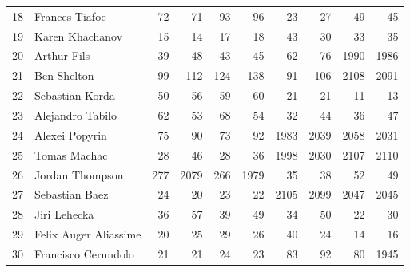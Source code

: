 \begin{table}[ht!]
\begin{tabular}{rlrrrrrrrr}
    18 & Frances Tiafoe & 72 & 71 & 93 & 96 & 23 & 27 & 49 & 45 \\
    19 & Karen Khachanov & 15 & 14 & 17 & 18 & 43 & 30 & 33 & 35 \\
    20 & Arthur Fils & 39 & 48 & 43 & 45 & 62 & 76 & 1990 & 1986 \\
    21 & Ben Shelton & 99 & 112 & 124 & 138 & 91 & 106 & 2108 & 2091 \\
    22 & Sebastian Korda & 50 & 56 & 59 & 60 & 21 & 21 & 11 & 13 \\
    23 & Alejandro Tabilo & 62 & 53 & 68 & 54 & 32 & 44 & 36 & 47 \\
    24 & Alexei Popyrin & 75 & 90 & 73 & 92 & 1983 & 2039 & 2058 & 2031 \\
    25 & Tomas Machac & 28 & 46 & 28 & 36 & 1998 & 2030 & 2107 & 2110 \\
    26 & Jordan Thompson & 277 & 2079 & 266 & 1979 & 35 & 38 & 52 & 49 \\
    27 & Sebastian Baez & 24 & 20 & 23 & 22 & 2105 & 2099 & 2047 & 2045 \\
    28 & Jiri Lehecka & 36 & 57 & 39 & 49 & 34 & 50 & 22 & 30 \\
    29 & Felix Auger Aliassime & 20 & 25 & 29 & 26 & 40 & 24 & 14 & 16 \\
    30 & Francisco Cerundolo & 21 & 21 & 24 & 23 & 83 & 92 & 80 & 1945 \\
    \bottomrule
  \end{tabular}
  \label{tab:ranking-comparison-clay-and-grass}
\end{table}



